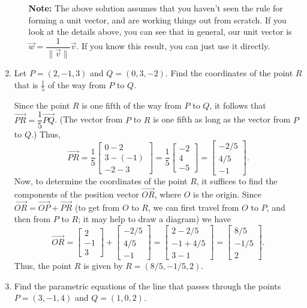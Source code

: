\documentclass[12pt]{article}
\newcommand{\len}[1]{\lVert #1\rVert}
\newcommand{\bbm}{\begin{bmatrix}}
\newcommand{\ebm}{\end{bmatrix}}
\begin{document}
\begin{enumerate}
\begin{enumerate}
\medskip

{\bf Note:} The above solution assumes that you haven't seen the rule for forming a unit vector, and are working things out from scratch. If you look at the details above, you can see that in general, our unit vector is $\vec{w} = \dfrac{1}{\len{\vec{v}}}\vec{v}$. If you know this result, you can just use it directly.


\vspace{1.2in}
\end{enumerate}
\item Let $P=(2,-1,3)$ and $Q=(0,3,-2)$. Find the coordinates of the point $R$ that is $\frac{1}{5}$ of the way from $P$ to $Q$.

\bigskip

Since the point $R$ is one fifth of the way from $P$ to $Q$, it follows that $\overrightarrow{PR} = \dfrac{1}{5}\overrightarrow{PQ}$. (The vector from $P$ to $R$ is one fifth as long as the vector from $P$ to $Q$.) Thus,
\[
 \overrightarrow{PR} = \frac{1}{5}\bbm 0-2\\3-(-1)\\-2-3\ebm = \frac{1}{5}\bbm -2\\4\\-5\ebm = \bbm -2/5\\4/5\\-1\ebm.
\]
Now, to determine the coordinates of the point $R$, it suffices to find the components of the position vector $\overrightarrow{OR}$, where $O$ is the origin. Since $\overrightarrow{OR} = \overrightarrow{OP}+\overrightarrow{PR}$ (to get from $O$ to $R$, we can first travel from $O$ to $P$, and then from $P$ to $R$; it may help to draw a diagram) we have
\[
 \overrightarrow{OR} = \bbm 2\\-1\\3\ebm + \bbm -2/5\\4/5\\-1\ebm = \bbm 2-2/5\\-1+4/5\\3-1\ebm = \bbm 8/5\\-1/5\\2\ebm.
\]
Thus, the point $R$ is given by $R=(8/5, -1/5, 2)$.

\bigskip

\item Find the parametric equations of the line that passes through the points $P=(3,-1,4)$ and $Q=(1,0,2)$.

\bigskip


\end{enumerate}
\end{document}

